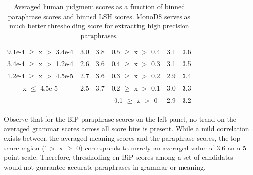 \documentclass[11pt]{article}
\begin{document}
\begin{table}
\begin{center}
\begin{tabular}{ccc|ccc}
{\scriptsize 9.1e-4 $\ge$ x $>$ 3.4e-4} & {\scriptsize 3.0} & {\scriptsize 3.8} & {\scriptsize 0.5 $\geq$ x $>$ 0.4} & {\scriptsize 3.1 } & {\scriptsize 3.6}  \\
{\scriptsize 3.4e-4 $\ge$ x $>$ 1.2e-4} & {\scriptsize 2.6} & {\scriptsize 3.6} & {\scriptsize 0.4 $\geq$ x $>$ 0.3} & {\scriptsize 3.1} & {\scriptsize 3.5} \\
{\scriptsize 1.2e-4 $\ge$ x $>$ 4.5e-5} & {\scriptsize 2.7} & {\scriptsize 3.6} & {\scriptsize 0.3 $\geq$ x $>$ 0.2} & {\scriptsize 2.9} & {\scriptsize 3.4} \\
{\scriptsize x $\le$ 4.5e-5} & {\scriptsize 2.5} & {\scriptsize 3.7} & {\scriptsize 0.2 $\geq$ x $>$ 0.1} & {\scriptsize 3.0} & {\scriptsize 3.3} \\
&&& {\scriptsize 0.1 $\geq$ x $>$ 0} & {\scriptsize 2.9} & {\scriptsize 3.2} \\
\hline
\end{tabular}
\end{center}
\caption{Averaged human judgment scores as a function of binned paraphrase scores and binned LSH scores. %
MonoDS serves as much better thresholding score for extracting high precision paraphrases.\vspace{-.12cm}}
\label{table9}
\end{table}


Observe that for the BiP paraphrase scores on the left panel, no trend on the averaged grammar scores across all score bins is present. While a mild correlation exists between the averaged meaning scores and the paraphrase scores, the top score region (1$>$ x $\ge$ 0) corresponds to merely an averaged value of 3.6 on a 5-point scale. Therefore, thresholding on BiP scores among a set of candidates would not guarantee accurate paraphrases in grammar or meaning.
\end{document}

